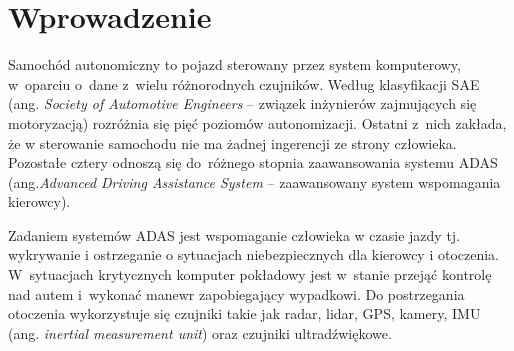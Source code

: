\chapter{Wprowadzenie}

Samochód  autonomiczny to pojazd sterowany przez system komputerowy, w~oparciu o~dane z~wielu różnorodnych czujników. 
Według klasyfikacji SAE (ang. \textit{Society of Automotive Engineers} -- związek inżynierów zajmujących się motoryzacją) rozróżnia się pięć poziomów autonomizacji. 
Ostatni z~nich zakłada, że w sterowanie samochodu nie ma żadnej ingerencji ze strony człowieka. 
Pozostałe cztery odnoszą się do~różnego stopnia zaawansowania systemu ADAS (ang.\textit{Advanced Driving Assistance System} -- zaawansowany system wspomagania kierowcy).

Zadaniem systemów ADAS jest wspomaganie człowieka w czasie jazdy tj. wykrywanie i ostrzeganie o sytuacjach niebezpiecznych dla kierowcy i otoczenia. 
W~sytuacjach krytycznych komputer pokładowy jest w~stanie przejąć kontrolę nad autem i~wykonać manewr zapobiegający wypadkowi. 
Do postrzegania otoczenia wykorzystuje się czujniki takie jak radar, lidar, GPS, kamery, IMU (ang. \textit{inertial measurement unit}) oraz czujniki ultradźwiękowe.

